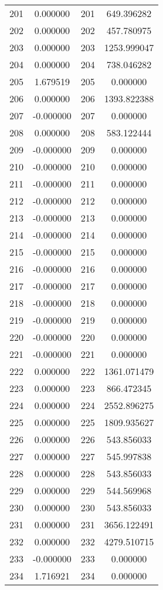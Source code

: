 \documentclass[12pt]{article}
\begin{document}
\begin{longtable}{@{}cccc@{}}
201 & 0.000000 & 201 & 649.396282 \\
202 & 0.000000 & 202 & 457.780975 \\
203 & 0.000000 & 203 & 1253.999047 \\
204 & 0.000000 & 204 & 738.046282 \\
205 & 1.679519 & 205 & 0.000000 \\
206 & 0.000000 & 206 & 1393.822388 \\
207 & -0.000000 & 207 & 0.000000 \\
208 & 0.000000 & 208 & 583.122444 \\
209 & -0.000000 & 209 & 0.000000 \\
210 & -0.000000 & 210 & 0.000000 \\
211 & -0.000000 & 211 & 0.000000 \\
212 & -0.000000 & 212 & 0.000000 \\
213 & -0.000000 & 213 & 0.000000 \\
214 & -0.000000 & 214 & 0.000000 \\
215 & -0.000000 & 215 & 0.000000 \\
216 & -0.000000 & 216 & 0.000000 \\
217 & -0.000000 & 217 & 0.000000 \\
218 & -0.000000 & 218 & 0.000000 \\
219 & -0.000000 & 219 & 0.000000 \\
220 & -0.000000 & 220 & 0.000000 \\
221 & -0.000000 & 221 & 0.000000 \\
222 & 0.000000 & 222 & 1361.071479 \\
223 & 0.000000 & 223 & 866.472345 \\
224 & 0.000000 & 224 & 2552.896275 \\
225 & 0.000000 & 225 & 1809.935627 \\
226 & 0.000000 & 226 & 543.856033 \\
227 & 0.000000 & 227 & 545.997838 \\
228 & 0.000000 & 228 & 543.856033 \\
229 & 0.000000 & 229 & 544.569968 \\
230 & 0.000000 & 230 & 543.856033 \\
231 & 0.000000 & 231 & 3656.122491 \\
232 & 0.000000 & 232 & 4279.510715 \\
233 & -0.000000 & 233 & 0.000000 \\
234 & 1.716921 & 234 & 0.000000 \\

\end{longtable}
\end{document}
